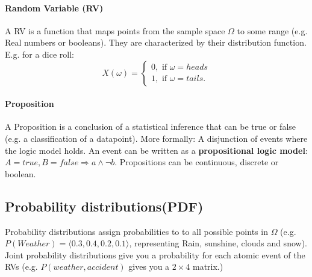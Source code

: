 \documentclass[../main.tex]{subfiles}
\begin{document}
    \paragraph{Random Variable (RV)}  A RV is a function that maps points from the sample space $\Omega$ to some range (e.g. Real numbers or booleans). They are characterized by their distribution function. E.g. for a dice roll:
            \[ X(\omega) = \begin{cases} 
                0, \text{ if } \omega = heads\\
                1, \text{ if } \omega = tails.
            \end{cases}
            \]

    \paragraph{Proposition}  A Proposition is a conclusion of a statistical inference that can be true or false (e.g. a classification of a datapoint). More formally: A disjunction of events where the logic model holds. An event can be written as a \textbf{propositional logic model}:\\ $A = true, B = false \Rightarrow a \land \neg b $. Propositions can be continuous, discrete or boolean. 

\subsection{Probability distributions(PDF)} 
        Probability distributions assign probabilities to to all possible points in $\Omega$ (e.g. $P(Weather) = \langle 0.3, 0.4, 0.2, 0.1 \rangle$, representing Rain, sunshine, clouds and snow). 
        Joint probability distributions give you a probability for each atomic event of the RVs (e.g. $P(weather, accident)$ gives you a $2\times 4$  matrix.)
\end{document}
